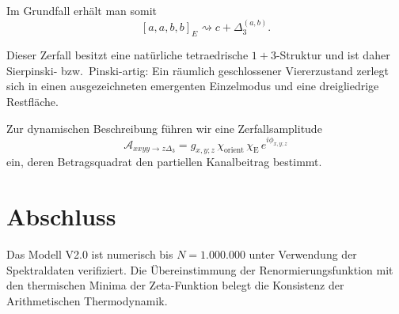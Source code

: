 \documentclass[11pt,a4paper]{article}
\begin{document}
	Im Grundfall erhält man somit
	\[
	[a,a,b,b]_E \rightsquigarrow c+\Delta_3^{(a,b)}.
	\]
	
	Dieser Zerfall besitzt eine natürliche tetraedrische \(1+3\)-Struktur und ist daher Sierpinski- bzw.\ Pinski-artig: Ein räumlich geschlossener Viererzustand zerlegt sich in einen ausgezeichneten emergenten Einzelmodus und eine dreigliedrige Restfläche.
	
	Zur dynamischen Beschreibung führen wir eine Zerfallsamplitude
	\[
	\mathcal A_{xxyy\to z\Delta_3}
	=
	g_{x,y;z}\,\chi_{\mathrm{orient}}\,\chi_{\mathrm{E}}\,e^{i\phi_{x,y;z}}
	\]
	ein, deren Betragsquadrat den partiellen Kanalbeitrag bestimmt.
	
	\section{Abschluss}
	Das Modell V2.0 ist numerisch bis $N=1.000.000$ unter Verwendung der Spektraldaten verifiziert. Die Übereinstimmung der Renormierungsfunktion mit den thermischen Minima der Zeta-Funktion belegt die Konsistenz der Arithmetischen Thermodynamik.
	
\end{document}
